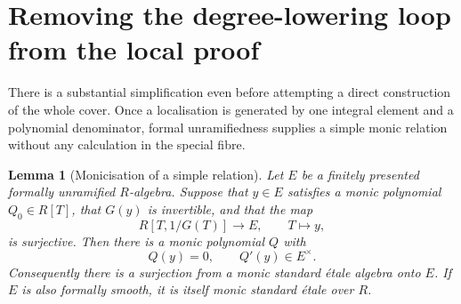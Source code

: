 \documentclass[11pt]{article}
\newtheorem{lemma}[theorem]{Lemma}
\begin{document}
\section{Removing the degree-lowering loop from the local proof}

There is a substantial simplification even before attempting a direct
construction of the whole cover. Once a localisation is generated by
one integral element and a polynomial denominator, formal unramifiedness
supplies a simple monic relation without any calculation in the special
fibre.

\begin{lemma}[Monicisation of a simple relation]\label{lem:monicise}
Let $E$ be a finitely presented formally unramified $R$-algebra. Suppose
that $y\in E$ satisfies a monic polynomial $Q_0\in R[T]$, that $G(y)$
is invertible, and that the map
\[
                  R[T,1/G(T)]\longrightarrow E,
                  \qquad T\longmapsto y,
\]
is surjective. Then there is a monic polynomial $Q$ with
\[
                  Q(y)=0,\qquad Q'(y)\in E^\times.
\]
Consequently there is a surjection from a monic standard \'etale
algebra onto $E$. If $E$ is also formally smooth, it is itself monic
standard \'etale over $R$.
\end{lemma}
\end{document}
